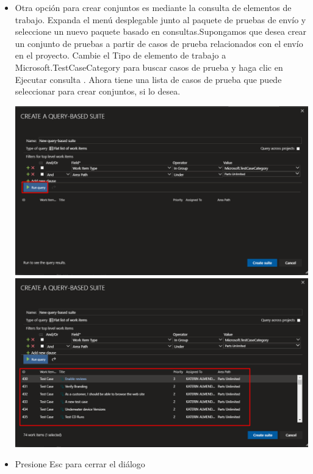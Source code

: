 \begin{itemize}
\item Otra opción para crear conjuntos es mediante la consulta de elementos de trabajo. Expanda el menú desplegable junto al paquete de pruebas de envío y seleccione un nuevo paquete basado en consultas.Supongamos que desea crear un conjunto de pruebas a partir de casos de prueba relacionados con el envío en el proyecto. Cambie el Tipo de elemento de trabajo a Microsoft.TestCaseCategory para buscar casos de prueba y haga clic en Ejecutar consulta . Ahora tiene una lista de casos de prueba que puede seleccionar para crear conjuntos, si lo desea.
\begin{center}
\includegraphics[width=\columnwidth]{images/38}\newline
\includegraphics[width=\columnwidth]{images/39}\newline
\end{center}

\item Presione Esc para cerrar el diálogo
\end{itemize}




